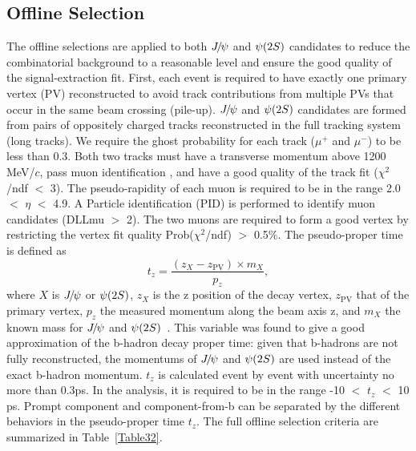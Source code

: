 \subsection{Offline Selection}
The offline selections are applied to both ${{J\mskip -3mu/\mskip -2mu\psi}}$ and ${\psi{(2S)}}$ candidates to reduce the combinatorial background 
to a reasonable level and ensure the good quality of the signal-extraction fit. First, each event is required to 
have exactly one primary vertex (PV) reconstructed to avoid track contributions from multiple PVs that occur in the 
same beam crossing (pile-up). ${{J\mskip -3mu/\mskip -2mu\psi}}$ and ${\psi{(2S)}}$ candidates are formed from pairs of oppositely charged tracks 
reconstructed in the full tracking system (long tracks). We require the ghost probability for each track ($\mu^+$ and $\mu^-$) 
to be less than 0.3. Both two tracks must have a transverse momentum \pt above 1200 MeV/$c$, pass muon identification 
, and have a good quality of the track fit ($\chi^2$/ndf $<$ 3). The pseudo-rapidity of each muon is required to 
be in the range 2.0 $<$ $\eta$ $<$ 4.9. A Particle identification (PID) is performed to identify muon candidates (DLLmu $>$ 2). 
The two muons are required to form a good vertex by restricting the vertex fit quality Prob($\chi^2$/ndf) $>$ 0.5$\%$.
The pseudo-proper time is defined as
\begin{equation}
    \label{PseudoDecayTime}
    t_z = \frac{(z_{X}-z_{\mathrm{PV}}) \times{} m_X}{p_z}, 
\end{equation}
where $X$ is ${{J\mskip -3mu/\mskip -2mu\psi}}$ or ${\psi{(2S)}}$, $z_{X}$ is the z position of the decay vertex, $z_{\mathrm{PV}}$ that of the primary vertex, 
$p_z$ the measured momentum along the beam axis z, and $m_X$ the known mass for ${{J\mskip -3mu/\mskip -2mu\psi}}$ and ${\psi{(2S)}}$~\cite{Workman:2022ynf}. 
This variable was found to give a good approximation of the b-hadron decay proper time: given that b-hadrons are not fully reconstructed, 
the momentums of ${{J\mskip -3mu/\mskip -2mu\psi}}$ and ${\psi{(2S)}}$ are used instead of the exact b-hadron momentum. $t_z$ is calculated event by event with 
uncertainty no more than 0.3ps. In the analysis, it is required to be in the range -10 $<$ $t_z$ $<$ 10 ps. Prompt component and 
component-from-b can be separated by the different behaviors in the pseudo-proper time $t_z$. The full offline selection criteria are 
summarized in Table~\ref{Table32}. 
